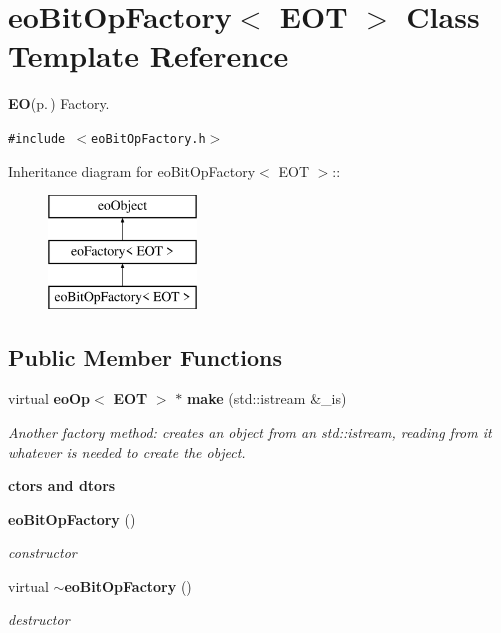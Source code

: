 \section{eo\-Bit\-Op\-Factory$<$ EOT $>$ Class Template Reference}
\label{classeo_bit_op_factory}
{\bf EO}{\rm (p.\,\pageref{class_e_o})} Factory.  


{\tt \#include $<$eo\-Bit\-Op\-Factory.h$>$}

Inheritance diagram for eo\-Bit\-Op\-Factory$<$ EOT $>$::\begin{figure}[H]
\begin{center}
\leavevmode
\includegraphics[height=3cm]{classeo_bit_op_factory}
\end{center}
\end{figure}
\subsection*{Public Member Functions}
\begin{CompactItemize}
\item 
virtual {\bf eo\-Op}$<$ {\bf EOT} $>$ $\ast$ {\bf make} (std::istream \&\_\-is)
\begin{CompactList}\small\item\em Another factory method: creates an object from an std::istream, reading from it whatever is needed to create the object. \item\end{CompactList}\end{CompactItemize}
\begin{Indent}{\bf ctors and dtors}\par
\begin{CompactItemize}
\item 
{\bf eo\-Bit\-Op\-Factory} ()\label{classeo_bit_op_factory_z23_0}

\begin{CompactList}\small\item\em constructor \item\end{CompactList}\item 
virtual {\bf $\sim$eo\-Bit\-Op\-Factory} ()\label{classeo_bit_op_factory_z23_1}

\begin{CompactList}\small\item\em destructor \item\end{CompactList}\end{CompactItemize}
\end{Indent}


